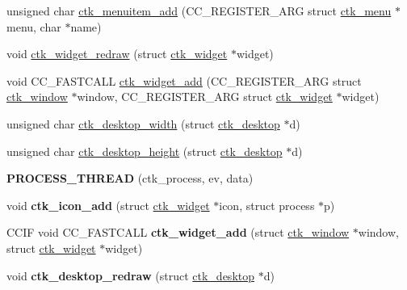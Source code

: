 \begin{DoxyCompactItemize}
\item 
unsigned char \hyperlink{group__ctkappfunc_gaaa8b54ce437af6b62eea13012ef6b83c}{ctk\+\_\+menuitem\+\_\+add} (C\+C\+\_\+\+R\+E\+G\+I\+S\+T\+E\+R\+\_\+\+A\+R\+G struct \hyperlink{structctk__menu}{ctk\+\_\+menu} $\ast$menu, char $\ast$name)
\item 
void \hyperlink{group__ctkappfunc_gaa01cba13f4c9a7719ea02876c779a02a}{ctk\+\_\+widget\+\_\+redraw} (struct \hyperlink{structctk__widget}{ctk\+\_\+widget} $\ast$widget)
\item 
void C\+C\+\_\+\+F\+A\+S\+T\+C\+A\+L\+L \hyperlink{group__ctkappfunc_gafdd6e4493fc97e7051d39ea806ee280f}{ctk\+\_\+widget\+\_\+add} (C\+C\+\_\+\+R\+E\+G\+I\+S\+T\+E\+R\+\_\+\+A\+R\+G struct \hyperlink{structctk__window}{ctk\+\_\+window} $\ast$window, C\+C\+\_\+\+R\+E\+G\+I\+S\+T\+E\+R\+\_\+\+A\+R\+G struct \hyperlink{structctk__widget}{ctk\+\_\+widget} $\ast$widget)
\item 
unsigned char \hyperlink{group__ctkappfunc_ga1c6cf638e8b8b09c5c8170d1392d5596}{ctk\+\_\+desktop\+\_\+width} (struct \hyperlink{structctk__desktop}{ctk\+\_\+desktop} $\ast$d)
\item 
unsigned char \hyperlink{group__ctkappfunc_ga2dc8829552117ddc7dc9d5d1780e5fd7}{ctk\+\_\+desktop\+\_\+height} (struct \hyperlink{structctk__desktop}{ctk\+\_\+desktop} $\ast$d)
\item 
\hypertarget{group__ctkappfunc_ga9566b07f64bff4c7697e3925680589a4}{}{\bfseries P\+R\+O\+C\+E\+S\+S\+\_\+\+T\+H\+R\+E\+A\+D} (ctk\+\_\+process, ev, data)\label{group__ctkappfunc_ga9566b07f64bff4c7697e3925680589a4}

\item 
\hypertarget{group__ctkappfunc_ga921c8ba8394c10d314b5b5c81f4b943f}{}void {\bfseries ctk\+\_\+icon\+\_\+add} (struct \hyperlink{structctk__widget}{ctk\+\_\+widget} $\ast$icon, struct process $\ast$p)\label{group__ctkappfunc_ga921c8ba8394c10d314b5b5c81f4b943f}

\item 
\hypertarget{group__ctkappfunc_gaf0dfc567cd2e4990b0f04b6aeedbfe0c}{}C\+C\+I\+F void C\+C\+\_\+\+F\+A\+S\+T\+C\+A\+L\+L {\bfseries ctk\+\_\+widget\+\_\+add} (struct \hyperlink{structctk__window}{ctk\+\_\+window} $\ast$window, struct \hyperlink{structctk__widget}{ctk\+\_\+widget} $\ast$widget)\label{group__ctkappfunc_gaf0dfc567cd2e4990b0f04b6aeedbfe0c}

\item 
\hypertarget{group__ctkappfunc_gae7e927cf4b10700bba8665c72e987459}{}void {\bfseries ctk\+\_\+desktop\+\_\+redraw} (struct \hyperlink{structctk__desktop}{ctk\+\_\+desktop} $\ast$d)\label{group__ctkappfunc_gae7e927cf4b10700bba8665c72e987459}

\end{DoxyCompactItemize}
